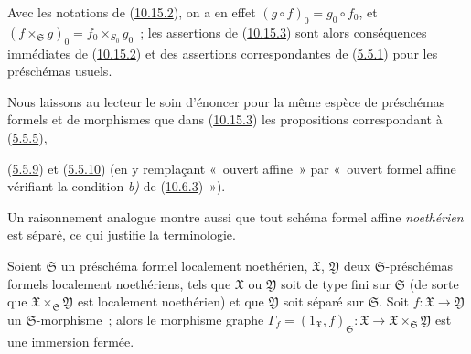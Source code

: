 Avec les notations de (\hyperref[I.10.15.2-fr]{10.15.2}), on a en effet
$(g\circ f)_0=g_0\circ f_0$, et
$(f\times_{\mathfrak{S}}g)_0=f_0\times_{S_0}g_0$~; les assertions de
(\hyperref[I.10.15.3-fr]{10.15.3}) sont alors conséquences immédiates de
(\hyperref[I.10.15.2-fr]{10.15.2}) et des assertions correspondantes de
(\hyperref[I.5.5.1-fr]{5.5.1}) pour les préschémas usuels.

Nous laissons au lecteur le soin d'énoncer pour la même espèce de
préschémas formels et de morphismes que dans
(\hyperref[I.10.15.3-fr]{10.15.3}) les propositions correspondant à
(\hyperref[I.5.5.5-fr]{5.5.5}),

(\hyperref[I.5.5.9-fr]{5.5.9}) et
(\hyperref[I.5.5.10-fr]{5.5.10}) (en y remplaçant «~ouvert affine~» par
«~ouvert formel affine vérifiant la condition \emph{b)} de
(\hyperref[I.10.6.3-fr]{10.6.3})~»).

Un raisonnement analogue montre aussi que tout schéma formel affine
\emph{noethérien} est séparé, ce qui justifie la terminologie.

\begin{proposition}[10.15.4]
\label{I.10.15.4-fr}
Soient $\mathfrak{S}$ un préschéma formel localement noethérien,
$\mathfrak{X}$, $\mathfrak{Y}$ deux $\mathfrak{S}$-préschémas formels
localement noethériens, tels que $\mathfrak{X}$ ou $\mathfrak{Y}$ soit de
type fini sur $\mathfrak{S}$ (de sorte que
$\mathfrak{X}\times_{\mathfrak{S}}\mathfrak{Y}$ est localement noethérien)
et que $\mathfrak{Y}$ soit séparé sur $\mathfrak{S}$. Soit
$f:\mathfrak{X}\to\mathfrak{Y}$ un $\mathfrak{S}$-morphisme~; alors le
morphisme graphe
$\Gamma_f=(1_{\mathfrak{X}},f)_{\mathfrak{S}}:\mathfrak{X}\to
\mathfrak{X}\times_{\mathfrak{S}}\mathfrak{Y}$ est une immersion fermée.
\end{proposition}


